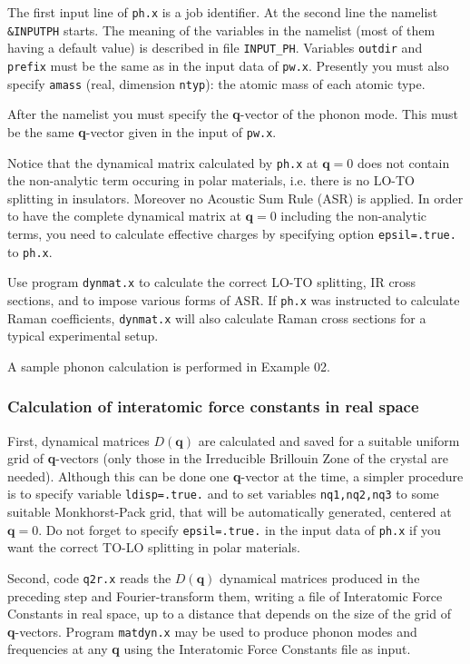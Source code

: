 \documentclass[12pt,a4paper]{article}
\begin{document}
The first input line of \texttt{ph.x} is a job identifier.
At the second line the namelist \texttt{\&INPUTPH} starts.
The meaning of the variables in the namelist (most of them having a
default value) is described in file \texttt{INPUT\_PH}.
Variables \texttt{outdir} and \texttt{prefix} must be the same as in
the input data of \texttt{pw.x}.
Presently you must also specify \texttt{amass} (real, dimension
\texttt{ntyp}): the atomic mass of each atomic type.

After the namelist you must specify the \textbf{q}-vector of the
phonon mode.
This must be the same \textbf{q}-vector given in the input of
\texttt{pw.x}.

Notice that the dynamical matrix calculated by \texttt{ph.x}
at $\mathbf{q}=0$ does not contain the non-analytic term
occuring in polar materials, i.e. there is no LO-TO splitting
in insulators. Moreover no Acoustic Sum Rule (ASR) is applied.
In order to have the complete dynamical matrix at $\mathbf{q}=0$ 
including the non-analytic terms, you need to calculate effective 
charges by specifying option \texttt{epsil=.true.} to \texttt{ph.x}. 

Use program \texttt{dynmat.x} to calculate the correct LO-TO 
splitting, IR cross sections, and to impose various forms
of ASR. If \texttt{ph.x} was instructed to calculate Raman 
coefficients, \texttt{dynmat.x} will also calculate Raman cross 
sections for a typical experimental setup.

A sample phonon calculation is performed in Example 02.

\subsubsection{Calculation of interatomic force constants in real
space}

First, dynamical matrices $D(\mathbf{q})$ are calculated and saved 
for a suitable uniform grid of \textbf{q}-vectors (only those in the 
Irreducible Brillouin Zone of the crystal are needed). Although
this can be done one \textbf{q}-vector at the time, a simpler procedure
is to specify variable \texttt{ldisp=.true.} and to set variables
\texttt{nq1,nq2,nq3} to some suitable Monkhorst-Pack grid, that
will be automatically generated, centered at $\mathbf{q}=0$.
Do not forget to specify \texttt{epsil=.true.} in the input data
of \texttt{ph.x} if you want the correct TO-LO splitting in 
polar materials. 

Second, code \texttt{q2r.x} reads the $D(\mathbf{q})$ dynamical 
matrices produced in the preceding step and Fourier-transform them,
writing a file of Interatomic Force Constants in real space, up
to a distance that depends on the size of the grid of
\textbf{q}-vectors.
Program \texttt{matdyn.x} may be used to produce phonon modes and
frequencies at any \textbf{q} using the Interatomic Force Constants
file as input.
\end{document}
